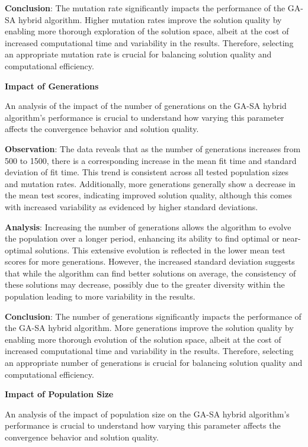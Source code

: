 \documentclass{article}
\begin{document}
    \textbf{Conclusion}: The mutation rate significantly impacts the performance of the GA-SA hybrid algorithm. Higher mutation rates improve the solution quality by enabling more thorough exploration of the solution space, albeit at the cost of increased computational time and variability in the results. Therefore, selecting an appropriate mutation rate is crucial for balancing solution quality and computational efficiency.

    \textbf{Impact of Generations}

    An analysis of the impact of the number of generations on the GA-SA hybrid algorithm’s performance is crucial to understand how varying this parameter affects the convergence behavior and solution quality.

    \textbf{Observation}: The data reveals that as the number of generations increases from 500 to 1500, there is a corresponding increase in the mean fit time and standard deviation of fit time. This trend is consistent across all tested population sizes and mutation rates. Additionally, more generations generally show a decrease in the mean test scores, indicating improved solution quality, although this comes with increased variability as evidenced by higher standard deviations.

    \textbf{Analysis}: Increasing the number of generations allows the algorithm to evolve the population over a longer period, enhancing its ability to find optimal or near-optimal solutions. This extensive evolution is reflected in the lower mean test scores for more generations. However, the increased standard deviation suggests that while the algorithm can find better solutions on average, the consistency of these solutions may decrease, possibly due to the greater diversity within the population leading to more variability in the results.

    \textbf{Conclusion}: The number of generations significantly impacts the performance of the GA-SA hybrid algorithm. More generations improve the solution quality by enabling more thorough evolution of the solution space, albeit at the cost of increased computational time and variability in the results. Therefore, selecting an appropriate number of generations is crucial for balancing solution quality and computational efficiency.

    \textbf{Impact of Population Size}

    An analysis of the impact of population size on the GA-SA hybrid algorithm’s performance is crucial to understand how varying this parameter affects the convergence behavior and solution quality.
\end{document}
